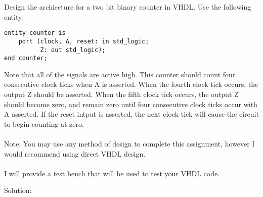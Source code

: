 Design the archiecture for a two bit binary counter in VHDL.  Use the following entity:
\lstset{language=VHDL}
\begin{lstlisting}
entity counter is
    port (clock, A, reset: in std_logic;
          Z: out std_logic);
end counter;
\end{lstlisting}
Note that all of the signals are active high.  This counter should count four consecutive clock ticks when A is asserted.  When the fourth clock tick occurs, the output Z should be asserted.  When the fifth clock tick occurs, the output Z should become zero, and remain zero until four consecutive clock ticks occur with A asserted.  If the reset intput is asserted, the next clock tick will cause the circuit to begin counting at zero.\\ \\
Note: You may use any method of design to complete this assignment, however I would recommend using direct VHDL design.\\ \\
I will provide a test bench that will be used to test your VHDL code.

Solution: \\ \\

